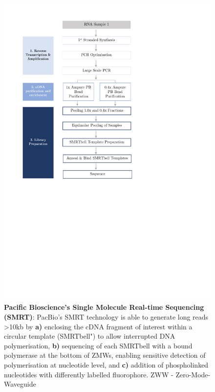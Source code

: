 \begin{figure}[h!]
	\centering
	\includegraphics[page=14,trim={0 5cm 0 0 },clip, scale = 0.7]{Figures/ProjectDevelopment_Figures.pdf}
	\captionsetup{width=0.95\textwidth}
	\caption[Pacific Bioscience's Single Molecule Real-time Sequencing]%
	{\textbf{Pacific Bioscience's Single Molecule Real-time Sequencing (SMRT)}: PacBio's SMRT technology is able to generate long reads >10kb by \textbf{a)} enclosing the cDNA fragment of interest within a circular template (SMRTbell") to allow interrupted DNA polymerisation, \textbf{b)} sequencing of each SMRTbell with a bound polymerase at the bottom of ZMWs, enabling sensitive detection of polymerisation at nucleotide level, and \textbf{c)} addition of phospholinked nucleotides with differently labelled fluorophore. ZWW - Zero-Mode-Waveguide}
	\label{fig:Mechanism}
\end{figure}


